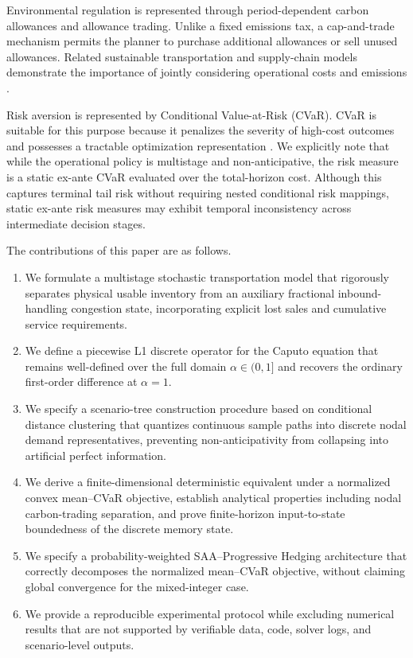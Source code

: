 \documentclass[11pt,a4paper]{article}
\begin{document}
Environmental regulation is represented through period-dependent
carbon allowances and allowance trading. Unlike a fixed emissions tax,
a cap-and-trade mechanism permits the planner to purchase additional
allowances or sell unused allowances. Related sustainable
transportation and supply-chain models demonstrate the importance of
jointly considering operational costs and emissions
\citep{bektas2011pollution,asghari2021green,qu2021carbon,mirzaee2024green,gbadegoye2025intermodal}.

Risk aversion is represented by Conditional Value-at-Risk (CVaR).
CVaR is suitable for this purpose because it penalizes the severity of
high-cost outcomes and possesses a tractable optimization
representation \citep{rockafellar2000,rockafellar2002cvar}. We explicitly
note that while the operational policy is multistage and non-anticipative,
the risk measure is a static ex-ante CVaR evaluated over the total-horizon
cost. Although this captures terminal tail risk without requiring nested
conditional risk mappings, static ex-ante risk measures may exhibit
temporal inconsistency across intermediate decision stages.

The contributions of this paper are as follows.

\begin{enumerate}
  \item We formulate a multistage stochastic transportation model that
  rigorously separates physical usable inventory from an auxiliary
  fractional inbound-handling congestion state, incorporating explicit
  lost sales and cumulative service requirements.

  \item We define a piecewise L1 discrete operator for the Caputo equation
  that remains well-defined over the full domain \(\alpha\in(0,1]\) and
  recovers the ordinary first-order difference at \(\alpha=1\).

  \item We specify a scenario-tree construction procedure based on
  conditional distance clustering that quantizes continuous sample
  paths into discrete nodal demand representatives, preventing
  non-anticipativity from collapsing into artificial perfect information.

  \item We derive a finite-dimensional deterministic equivalent under a
  normalized convex mean--CVaR objective, establish analytical
  properties including nodal carbon-trading separation, and prove
  finite-horizon input-to-state boundedness of the discrete memory
  state.

  \item We specify a probability-weighted SAA--Progressive Hedging
  architecture that correctly decomposes the normalized mean--CVaR
  objective, without claiming global convergence for the mixed-integer
  case.

  \item We provide a reproducible experimental protocol while excluding
  numerical results that are not supported by verifiable data, code,
  solver logs, and scenario-level outputs.
\end{enumerate}
\end{document}
